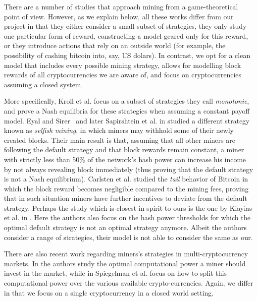 There are a number of studies that approach mining from a game-theoretical point of view. However, as we explain below, all these works 
differ from our project in that they either consider a small subset of strategies, they only study one particular form of reward, constructing a model geared only for this reward, 
or they introduce actions that rely on an outside world (for example, the possibility of cashing bitcoin into, say, US dolars). In contrast, we opt for a clean model that includes every possible mining strategy, allows for modelling block rewards of all cryptocurrencies we are aware of, and focus on cryptocurrencies assuming a closed system. 

More specifically,  Kroll et al. \cite{economics_of_mining2013} focus on a subset of strategies they call \emph{monotonic}, and prove a 
Nash equilibria for these strategies when assuming a constant payoff model. Eyal and Sirer~\cite{selfishmining2014}  and later Sapirshtein et al. in \cite{optimalselfishmining2017} studied a different strategy known as \emph{selfish mining}, in which miners may withhold some of their newly created blocks. Their main result is that, assuming that all other miners are following the default strategy and that block rewards remain constant, a miner with strictly less than 50\% of the network's hash power can increase his income by not always revealing block immediately (thus proving that the default strategy is not a Nash equilibrium). Carlsten et al. \cite{instabilitywithoutreward:2016} studied the \emph{tail} behavior of Bitcoin in which the block reward becomes negligible compared to the mining fees, proving that in such situation miners have further incentives to deviate from the default strategy. 
Perhaps the study which is closest in spirit to ours is the one by Kiayias et al. in \cite{mininggames:2016}. %
Here the authors also focus on the hash power thresholds for which the optimal default strategy is not an optimal strategy anymore. Albeit the authors consider a range of strategies, their model is not able to consider the same as our. %

There are also recent work regarding miners's strategies in multi-cryptocurrency markets. In \cite{dhamal2018stochastic} the authors study the optimal computational power a miner should invest in the market, while in \cite{spiegelman2018game} Spiegelman et al. focus on how to split this computational power over the various available crypto-currencies. Again, we differ in that we focus on a single cryptocurrency in a closed world setting.
